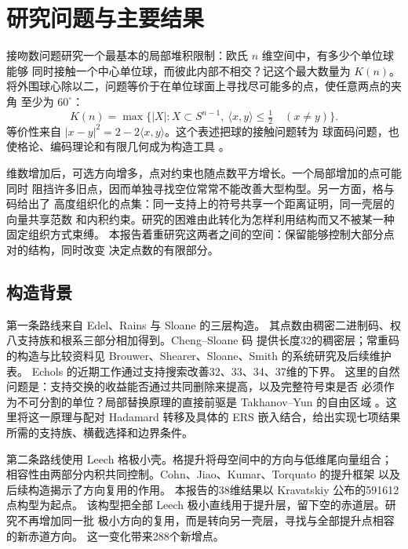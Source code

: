 \section{研究问题与主要结果}

接吻数问题研究一个最基本的局部堆积限制：欧氏 $n$ 维空间中，有多少个单位球能够
同时接触一个中心单位球，而彼此内部不相交？记这个最大数量为 $K(n)$。
将外围球心除以二，问题等价于在单位球面上寻找尽可能多的点，使任意两点的夹角
至少为 $60^\circ$：
\[
K(n)=\max\{|X|:X\subset S^{n-1},\
\langle x,y\rangle\le\tfrac12\quad(x\ne y)\}.
\]
等价性来自 $|x-y|^2=2-2\langle x,y\rangle$。这个表述把球的接触问题转为
球面码问题，也使格论、编码理论和有限几何成为构造工具
\cite{conway1999sphere,dgs,leech-sloane1971}。

维数增加后，可选方向增多，点对约束也随点数平方增长。一个局部增加的点可能同时
阻挡许多旧点，因而单独寻找空位常常不能改善大型构型。另一方面，格与码给出了
高度组织化的点集：同一支持上的符号共享一个距离证明，同一壳层的向量共享范数
和内积约束。研究的困难由此转化为怎样利用结构而又不被某一种固定组织方式束缚。
本报告着重研究这两者之间的空间：保留能够控制大部分点对的结构，同时改变
决定点数的有限部分。



\subsection{构造背景}

第一条路线来自 Edel、Rains 与 Sloane 的三层构造\cite{ers}。
其点数由稠密二进制码、权八支持族和根系三部分相加得到。Cheng--Sloane 码
提供长度32的稠密层\cite{chengsloane}；常重码的构造与比较资料见
Brouwer、Shearer、Sloane、Smith 的系统研究及后续维护表\cite{bsss,brouwer}。
Echols 的近期工作通过支持搜索改善32、33、34、37维的下界\cite{echols}。
这里的自然问题是：支持交换的收益能否通过共同删除来提高，以及完整符号束是否
必须作为不可分割的单位？局部替换原理的直接前驱是 Takhanov--Yun 的自由区域
\cite[第V节]{signed-johnson}。这里将这一原理与配对 Hadamard 转移及具体的
ERS 嵌入结合，给出实现七项结果所需的支持族、横截选择和边界条件。

第二条路线使用 Leech 格极小壳。格提升将母空间中的方向与低维尾向量组合；
相容性由两部分内积共同控制。Cohn、Jiao、Kumar、Torquato 的提升框架
\cite[定理7.5]{cjkt}以及后续构造揭示了方向复用的作用。
本报告的38维结果以 Kravatskiy 公布的591612点构型为起点\cite{kissingnumbers}。
该构型把全部 Leech 极小直线用于提升层，留下空的赤道层。研究不再增加同一批
极小方向的复用，而是转向另一壳层，寻找与全部提升点相容的新赤道方向。
这一变化带来288个新增点。

